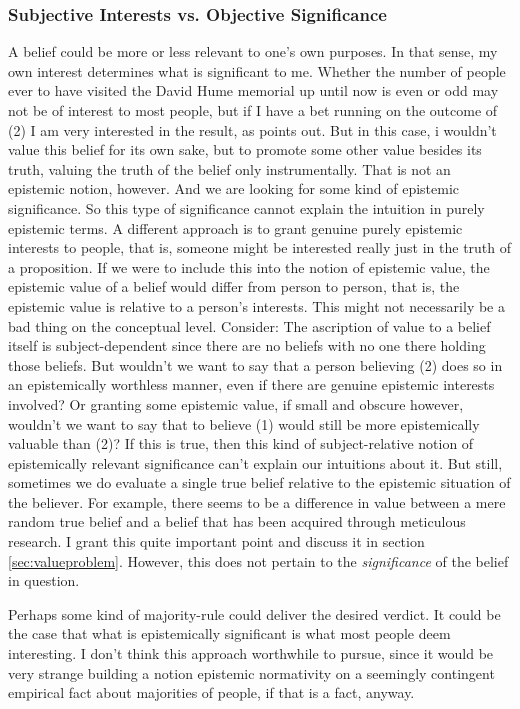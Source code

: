 \documentclass[12pt,numbers=noenddot]{scrartcl}
\begin{document}
\subsubsection{Subjective Interests vs. Objective Significance}
A belief could be more or less relevant to one's own purposes. In that sense, my own interest determines what is significant to me. Whether the number of people ever to have visited the David Hume memorial up until now is even or odd may not be of interest to most people, but if I have a bet running on the outcome of (2) I am very interested in the result, as \textcite[333]{Ahlstrom-Vij2013} points out. But in this case, i wouldn't value this belief for its own sake, but to promote some other value besides its truth, valuing the truth of the belief only instrumentally. That is not an epistemic notion, however. And we are looking for some kind of epistemic significance. So this type of significance cannot explain the intuition in purely epistemic terms. A different approach is to grant genuine purely epistemic interests to people, that is, someone might be interested really just in the truth of a proposition. If we were to include this into the notion of epistemic value, the epistemic value of a belief would differ from person to person, that is, the epistemic value is relative to a person's interests. This might not necessarily be a bad thing on the conceptual level. Consider: The ascription of value to a belief itself is subject-dependent since there are no beliefs with no one there holding those beliefs. But wouldn't we want to say that a person believing (2) does so in an epistemically worthless manner, even if there are genuine epistemic interests involved? Or granting some epistemic value, if small and obscure however, wouldn't we want to say that to believe (1) would still be more epistemically  valuable than (2)? If this is true, then this kind of subject-relative notion of epistemically relevant significance can't explain our intuitions about it. But still, sometimes we do evaluate a single true belief relative to the epistemic situation of the believer. For example, there seems to be a difference in value between a mere random true belief and a belief that has been acquired through meticulous research. I grant this quite important point and discuss it in section \ref{sec:valueproblem}. However, this does not pertain to the \emph{significance} of the belief in question.

Perhaps some kind of majority-rule could deliver the desired verdict. It could be the case that what is epistemically significant is what most people deem interesting. I don't think this approach worthwhile to pursue, since it would be very strange building a notion epistemic normativity on a seemingly contingent empirical fact about majorities of people, if that is a fact, anyway.
\end{document}

